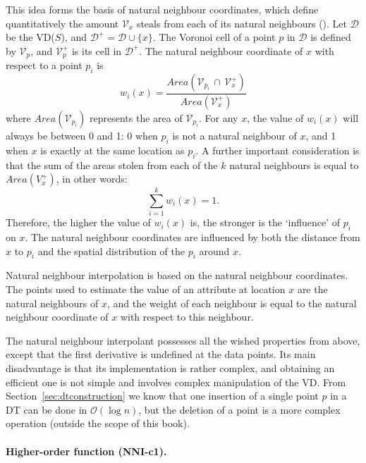 This idea forms the basis of natural neighbour coordinates, which define quantitatively the amount $\mathcal{V}_{x}$ steals from each of its natural neighbours (). 
Let $\mathcal{D}$ be the VD($S$), and $\mathcal{D}^{+} = \mathcal{D} \cup \{x\}$. 
The Voronoi cell of a point $p$ in $\mathcal{D}$ is defined by $\mathcal{V}_{p}$, and $\mathcal{V}^{+}_{p}$ is its cell in $\mathcal{D}^{+}$. 
The natural neighbour coordinate of $x$ with respect to a point $p_{i}$ is
\begin{equation}
  w_{i}(x) = \frac{Area(\mathcal{V}_{p_{i}} \, \cap \, \mathcal{V}^{+}_{x})}{Area(\mathcal{V}^{+}_{x})}
  \label{eq:nnc}
\end{equation}
where $Area(\mathcal{V}_{p_{i}})$ represents the area of $\mathcal{V}_{p_{i}}$. 
For any $x$, the value of $w_{i}(x)$ will always be between 0 and 1: 0 when $p_{i}$ is not a natural neighbour of $x$, and 1 when $x$ is exactly at the same location as $p_{i}$. 
A further important consideration is that the sum of the areas stolen from each of the $k$ natural neighbours is equal to $Area(V^{+}_{x})$, in other words:
\begin{equation}
  \sum_{i=1}^{k} w_{i}(x) = 1.
\end{equation}
Therefore, the higher the value of $w_{i}(x)$ is, the stronger is the `influence' of $p_{i}$ on $x$. 
The natural neighbour coordinates are influenced by both the distance from $x$ to $p_{i}$ and the spatial distribution of the $p_{i}$ around $x$. 

%

Natural neighbour interpolation is based on the natural neighbour coordinates. 
The points used to estimate the value of an attribute at location $x$ are the natural neighbours of $x$, and the weight of each neighbour is equal to the natural neighbour coordinate of $x$ with respect to this neighbour.  

The natural neighbour interpolant possesses all the wished properties from above, except that the first derivative is undefined at the data points. 
Its main disadvantage is that its implementation is rather complex, and obtaining an efficient one is not simple and involves complex manipulation of the VD\@.
From Section~\ref{sec:dtconstruction} we know that one insertion of a single point $p$ in a DT can be done in $\mathcal{O}(\log n)$, but the deletion of a point is a more complex operation (outside the scope of this book).


\paragraph{Higher-order function  (\textbf{NNI-c1}).}

